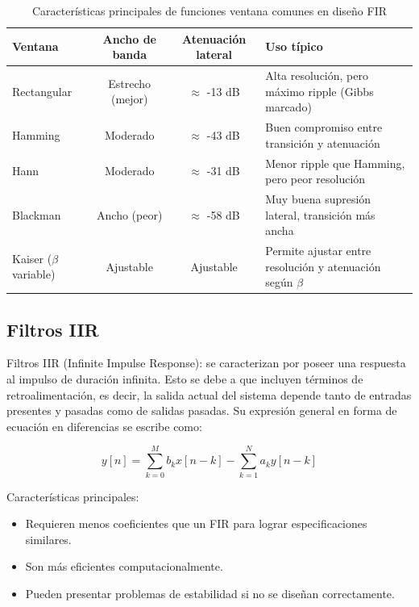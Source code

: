 \documentclass[12pt]{article}
\begin{document}
	\begin{table}[H]
		\centering
		\begin{tabularx}{\textwidth}{|l|c|c|X|}
			\hline
			\textbf{Ventana} & \textbf{Ancho de banda} & \textbf{Atenuación lateral} & \textbf{Uso típico} \\
			\hline
			Rectangular & Estrecho (mejor) & $\approx$ -13 dB & Alta resolución, pero máximo ripple (Gibbs marcado) \\
			\hline
			Hamming     & Moderado          & $\approx$ -43 dB & Buen compromiso entre transición y atenuación \\
			\hline
			Hann        & Moderado          & $\approx$ -31 dB & Menor ripple que Hamming, pero peor resolución \\
			\hline
			Blackman    & Ancho (peor)      & $\approx$ -58 dB & Muy buena supresión lateral, transición más ancha \\
			\hline
			Kaiser ($\beta$ variable) & Ajustable & Ajustable & Permite ajustar entre resolución y atenuación según $\beta$ \\
			\hline
		\end{tabularx}
		\caption{Características principales de funciones ventana comunes en diseño FIR}
		\label{tabla:ventanas}
	\end{table}
	
	
	\subsection{Filtros IIR}
	Filtros IIR (Infinite Impulse Response): se caracterizan por poseer una respuesta al impulso de duración infinita. Esto se debe a que incluyen términos de retroalimentación, es decir, la salida actual del sistema depende tanto de entradas presentes y pasadas como de salidas pasadas. Su expresión general en forma de ecuación en diferencias se escribe como:
	
	\begin{equation}
		y[n] = \sum_{k=0}^{M} b_k x[n-k] - \sum_{k=1}^{N} a_k y[n-k]
	\end{equation}
	
	Características principales:
	\begin{itemize}
		\item Requieren menos coeficientes que un FIR para lograr especificaciones similares.
		\item Son más eficientes computacionalmente.
		\item Pueden presentar problemas de estabilidad si no se diseñan correctamente.
	\end{itemize}
	
\end{document}
